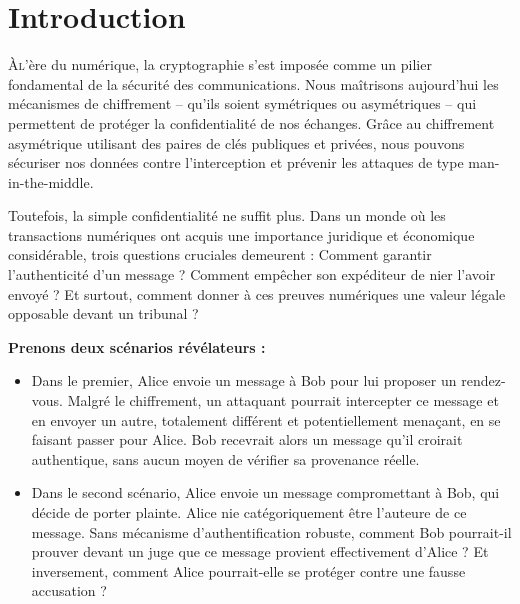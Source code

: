 \documentclass[11pt]{article}
\begin{document}
\newpage

\setlength\headheight{15pt} 





 

\tableofcontents

\newpage

\section*{Introduction}

\lettrine{À} l'ère du numérique, la cryptographie s'est imposée comme un pilier fondamental de la sécurité des communications. Nous maîtrisons aujourd'hui les mécanismes de chiffrement – qu'ils soient symétriques ou asymétriques – qui permettent de protéger la confidentialité de nos échanges. Grâce au chiffrement asymétrique utilisant des paires de clés publiques et privées, nous pouvons sécuriser nos données contre l'interception et prévenir les attaques de type man-in-the-middle.

Toutefois, la simple confidentialité ne suffit plus. Dans un monde où les transactions numériques ont acquis une importance juridique et économique considérable, trois questions cruciales demeurent : Comment garantir l'authenticité d'un message ? Comment empêcher son expéditeur de nier l'avoir envoyé ? Et surtout, comment donner à ces preuves numériques une valeur légale opposable devant un tribunal ?

\textbf{Prenons deux scénarios révélateurs :} 

\begin{itemize}

    \item Dans le premier, Alice envoie un message à Bob pour lui proposer un rendez-vous. Malgré le chiffrement, un attaquant pourrait intercepter ce message et en envoyer un autre, totalement différent et potentiellement menaçant, en se faisant passer pour Alice. Bob recevrait alors un message qu'il croirait authentique, sans aucun moyen de vérifier sa provenance réelle.

    \item Dans le second scénario, Alice envoie un message compromettant à Bob, qui décide de porter plainte. Alice nie catégoriquement être l'auteure de ce message. Sans mécanisme d'authentification robuste, comment Bob pourrait-il prouver devant un juge que ce message provient effectivement d'Alice ? Et inversement, comment Alice pourrait-elle se protéger contre une fausse accusation ?

\end{itemize}
    
\end{document}
